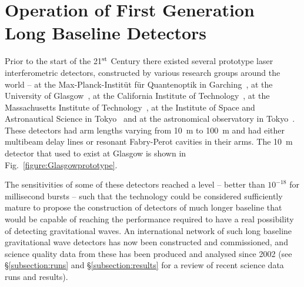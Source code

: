 \documentclass{article}
\begin{document}
\newpage

\section{Operation of First Generation Long Baseline Detectors}
\label{section:construction}

Prior to the start of the 21$^{\rm st}$ Century there existed several prototype
laser interferometric detectors, constructed by various research groups around
the world -- at the Max-Planck-Instit\"ut f\"ur Quantenoptik in
Garching~\cite{Shoemaker}, at the University of Glasgow~\cite{Robertson}, at the
California Institute of Technology~\cite{Abramovici}, at the Massachusetts
Institute of Technology~\cite{Fritschel2}, at the Institute of Space and
Astronautical Science in Tokyo~\cite{Mizuno} and at the astronomical observatory
in Tokyo~\cite{Araya}. These detectors had arm lengths varying from 10~m to
100~m and had either multibeam delay lines or resonant Fabry-Perot cavities in
their arms.  The 10~m detector that used to exist at Glasgow is shown in
Fig.~\ref{figure:Glasgowprototype}.


The sensitivities of some of these detectors reached a level -- better than
$10^{-18}$ for millisecond bursts -- such that the technology could be
considered sufficiently mature to propose the construction of detectors of much
longer baseline that would be capable of reaching the performance required to
have a real possibility of detecting gravitational waves.  An international
network of such long baseline gravitational wave detectors has now been
constructed and commissioned, and science quality data from these has been
produced and analysed since 2002 (see \S\ref{subsection:runs} and
\S\ref{subsection:results} for a review of recent science data runs and
results).
\end{document}
